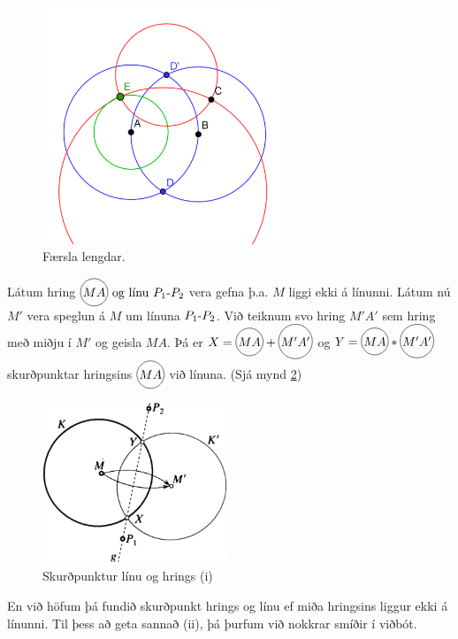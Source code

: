 \begin{frame}
  \begin{figure}[H]
    \centering
    \includegraphics[width=0.65\textwidth]{CompassEquivTheorem.png}
    \caption{Færsla lengdar.}
    \label{fig:CET}
  \end{figure}
\end{frame}
\begin{frame}
  \begin{hfsmid}
    \label{hfsmid:skpomidjulinuoghrings}
    Látum hring \(\hri{MA} \Og \text{línu } \lin{P_1}{P_2}\)
    vera gefna þ.a.  \(M\) liggi ekki á línunni.
    Látum nú \(M'\) vera speglun á \(M\) um línuna \(\lin{P_1}{P_2}\).
    Við teiknum svo hring \(M'A'\) sem hring með miðju í \(M'\)
    og geisla \(MA\).
    Þá er \( X = \hri{MA} + \hri{M'A'} \) og \(Y = \hri{MA}*\hri{M'A'}\)
    skurðpunktar hringsins \(\hri{MA}\) við línuna.
    (Sjá mynd \ref{fig:mmcon1})
  \end{hfsmid}
\end{frame}

\begin{frame}
  \begin{figure}[H]
    \centering
    \includegraphics[width=0.5\textwidth]{MohrMaschCon1.png}
    \caption{Skurðpunktur línu og hrings (i)}
    \label{fig:mmcon1}
  \end{figure}
  En við höfum þá fundið skurðpunkt hrings og línu ef miða hringsins liggur
  ekki á línunni.
  Til þess að geta sannað (ii), þá þurfum við nokkrar smíðir í viðbót.
\end{frame}

